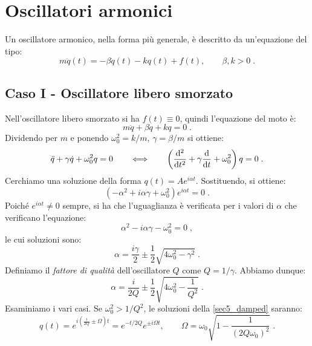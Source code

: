 \section{Oscillatori armonici}
Un oscillatore armonico, nella forma più generale, è descritto da un'equazione del tipo:
\begin{equation}
m\ddot{q}(t)=-\beta\dot{q}(t)-kq(t)+f(t), \qquad \beta,k>0\;.
\end{equation}
\subsection{Caso I - Oscillatore libero smorzato}
Nell'oscillatore libero smorzato si ha $f(t)\equiv 0$, quindi l'equazione del moto è:
\begin{equation}
m\ddot{q}+\beta\dot{q}+kq=0\;. \label{sec5_damped}
\end{equation}
Dividendo per $m$ e ponendo $\omega_0^2=k/m$, $\gamma=\beta/m$ si ottiene:
\begin{equation}
\ddot{q}+\gamma\dot{q}+\omega_0^2q=0\qquad  \Longleftrightarrow\qquad  \left(\frac{\diff^2}{\diff[t]^2}+\gamma\frac{\diff}{\diff[t]}+\omega_0^2\right)q=0\;.
\end{equation}
Cerchiamo una soluzione della forma $q(t)=Ae^{i\alpha t}$. Sostituendo, si ottiene:
\begin{equation}
(-\alpha^2+i\alpha\gamma+\omega_0^2)e^{i\alpha t}=0\;.
\end{equation}
Poiché $e^{i\alpha t}\ne 0$ sempre, si ha che l'uguaglianza è verificata per i valori di $\alpha$ che verificano l'equazione:
\begin{equation}
\alpha^2-i\alpha\gamma-\omega_0^2=0\;,
\end{equation}
le cui soluzioni sono:
\begin{equation}
\alpha=\frac{i\gamma}{2}\pm\frac{1}{2}\sqrt{4\omega_0^2-\gamma^2}\;.
\end{equation}
Definiamo il \textit{fattore di qualità} dell'oscillatore $Q$ come $Q=1/\gamma$. Abbiamo dunque:
\begin{equation}
\alpha=\frac{i}{2Q}\pm\frac{1}{2}\sqrt{4\omega_0^2-\frac{1}{Q^2}}\;.
\end{equation}
Esaminiamo i vari casi. Se $\omega_0^2>1/Q^2$, le soluzioni della \eqref{sec5_damped} saranno:
\begin{equation}
q(t)=e^{i\left(\frac{i}{2Q}\pm\Omega\right)t}=e^{-t/2Q}e^{\pm i\Omega t}, \qquad \Omega=\omega_0\sqrt{1-\frac{1}{(2Q\omega_0)^2}}\;.
\end{equation}
